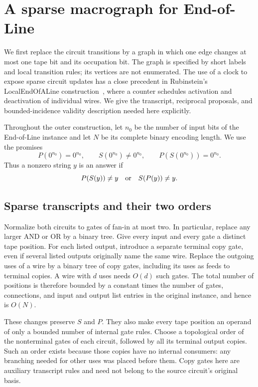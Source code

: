 \section{A sparse macrograph for End-of-Line}\label{sec:macrograph}

We first replace the circuit transitions by a graph in which one edge
changes at most one tape bit and its occupation bit.  The graph is
specified by short labels and local transition rules; its vertices are
not enumerated.  The use of a clock to expose sparse circuit updates
has a close precedent in Rubinstein's LocalEndOfALine
construction~\cite[Sections~5--5.1]{Rubinstein2016Settling}, where a
counter schedules activation and deactivation of individual wires.
We give the transcript, reciprocal proposals, and bounded-incidence
validity description needed here explicitly.

Throughout the outer construction, let $n_0$ be the
number of input bits of the End-of-Line instance and let $N$ be its
complete binary encoding length.  We use the promises
\begin{equation}\label{macro:promises}
 P(0^{n_0})=0^{n_0},\qquad S(0^{n_0})\ne0^{n_0},\qquad
 P(S(0^{n_0}))=0^{n_0}.
\end{equation}
Thus a nonzero string $y$ is an answer if
\begin{equation}\label{macro:answer}
 P(S(y))\ne y\quad\hbox{or}\quad S(P(y))\ne y.
\end{equation}

\subsection{Sparse transcripts and their two orders}\label{macro:transcripts}

Normalize both circuits to gates of fan-in at most two.  In particular,
replace any larger AND or OR by a binary tree.  Give every input and
every gate a distinct tape position.  For each listed output, introduce
a separate terminal copy gate, even if several listed outputs originally
name the same wire.  Replace the outgoing uses of a wire by a binary
tree of copy gates, including its uses as feeds to terminal copies.
A wire with $d$ uses needs $O(d)$ such gates.  The total number of
positions is therefore bounded by a constant times the number of gates,
connections, and input and output list entries in the original instance,
and hence is $O(N)$.

These changes preserve $S$ and $P$.  They also make every tape position
an operand of only a bounded number of internal gate rules.  Choose a
topological order of the nonterminal gates of each circuit, followed by
all its terminal output copies.  Such an order exists because those
copies have no internal consumers: any branching needed for other uses
was placed before them.  Copy gates here are auxiliary transcript rules
and need not belong to the source circuit's original basis.

